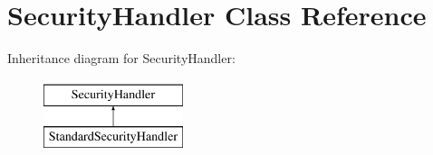 \hypertarget{class_security_handler}{}\section{Security\+Handler Class Reference}
\label{class_security_handler}
Inheritance diagram for Security\+Handler\+:\begin{figure}[H]
\begin{center}
\leavevmode
\includegraphics[height=2.000000cm]{class_security_handler}
\end{center}
\end{figure}

